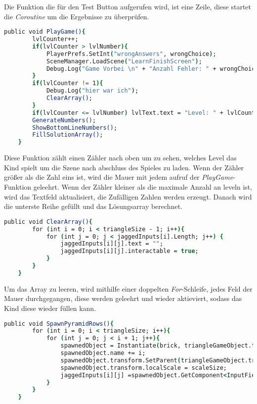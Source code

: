 Die Funktion die für den Test Button aufgerufen wird, ist eine Zeile, diese startet die \textit{Coroutine} um die Ergebnisse zu überprüfen.\\
\begin{lstlisting}[language=csh, caption={Triangle.cs PlayGame-Funktion}]
	public void PlayGame(){
		lvlCounter++;
		if(lvlCounter > lvlNumber){
			PlayerPrefs.SetInt("wrongAnswers", wrongChoice);
			SceneManager.LoadScene("LearnFinishScreen");
			Debug.Log("Game Vorbei \n" + "Anzahl Fehler: " + wrongChoice);
		}
		if(lvlCounter != 1){
			Debug.Log("hier war ich");
			ClearArray();
		}
		if(lvlCounter <= lvlNumber)	lvlText.text = "Level: " + lvlCounter + "/" + lvlNumber;
		GenerateNumbers();
		ShowBottomLineNumbers();
		FillSolutionArray();
	}
\end{lstlisting}
Diese Funktion zählt einen Zähler nach oben um zu sehen, welches Level das Kind spielt um die Szene nach abschluss des Spieles zu laden. Wenn der Zähler größer als die Zahl eins ist, wird die Mauer mit jedem aufruf der \textit{PlayGame}-Funktion geleehrt. Wenn der Zähler kleiner als die maximale Anzahl an leveln ist, wird das Textfeld aktualisiert, die Zufälligen Zahlen werden erzeugt. Danach wird die unterste Reihe gefüllt und das Lösungsarray berechnet.\\ 
\begin{lstlisting}[language=csh, caption={Triangle.cs ClearArray-Funktion}]
	public void ClearArray(){
		for (int i = 0; i < triangleSize - 1; i++){
			for (int j = 0; j < jaggedInputs[i].Length; j++) {
				jaggedInputs[i][j].text = "";
				jaggedInputs[i][j].interactable = true;
			}
		}
	}
\end{lstlisting}
Um das Array zu leeren, wird mithilfe einer doppelten \textit{For}-Schleife, jedes Feld der Mauer durchgegangen, diese werden geleehrt und wieder aktieviert, sodass das Kind diese wieder füllen kann.\\
\begin{lstlisting}[language=csh, caption={Triangle.cs SpawnPyramidRows-Funktion}]
	public void SpawnPyramidRows(){
		for (int i = 0; i < triangleSize; i++){
			for (int j = 0; j < i + 1; j++){
				spawnedObject = Instantiate(brick, triangleGameObject.transform.position, Quaternion.identity);
				spawnedObject.name += i;
				spawnedObject.transform.SetParent(triangleGameObject.transform.GetChild(i));
				spawnedObject.transform.localScale = scaleSize;
				jaggedInputs[i][j] =spawnedObject.GetComponent<InputField>();
			}
		}
	}
\end{lstlisting}
